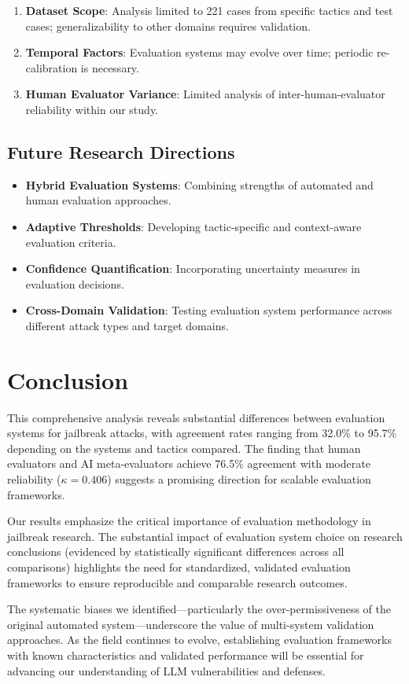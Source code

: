 \documentclass[11pt]{article}
\begin{document}
\begin{enumerate}
    \item \textbf{Dataset Scope}: Analysis limited to 221 cases from specific tactics and test cases; generalizability to other domains requires validation.
    \item \textbf{Temporal Factors}: Evaluation systems may evolve over time; periodic re-calibration is necessary.
    \item \textbf{Human Evaluator Variance}: Limited analysis of inter-human-evaluator reliability within our study.
\end{enumerate}

\subsection{Future Research Directions}

\begin{itemize}
    \item \textbf{Hybrid Evaluation Systems}: Combining strengths of automated and human evaluation approaches.
    \item \textbf{Adaptive Thresholds}: Developing tactic-specific and context-aware evaluation criteria.
    \item \textbf{Confidence Quantification}: Incorporating uncertainty measures in evaluation decisions.
    \item \textbf{Cross-Domain Validation}: Testing evaluation system performance across different attack types and target domains.
\end{itemize}

\section{Conclusion}

This comprehensive analysis reveals substantial differences between evaluation systems for jailbreak attacks, with agreement rates ranging from 32.0\% to 95.7\% depending on the systems and tactics compared. The finding that human evaluators and AI meta-evaluators achieve 76.5\% agreement with moderate reliability ($\kappa = 0.406$) suggests a promising direction for scalable evaluation frameworks.

Our results emphasize the critical importance of evaluation methodology in jailbreak research. The substantial impact of evaluation system choice on research conclusions (evidenced by statistically significant differences across all comparisons) highlights the need for standardized, validated evaluation frameworks to ensure reproducible and comparable research outcomes.

The systematic biases we identified—particularly the over-permissiveness of the original automated system—underscore the value of multi-system validation approaches. As the field continues to evolve, establishing evaluation frameworks with known characteristics and validated performance will be essential for advancing our understanding of LLM vulnerabilities and defenses.
\end{document}
